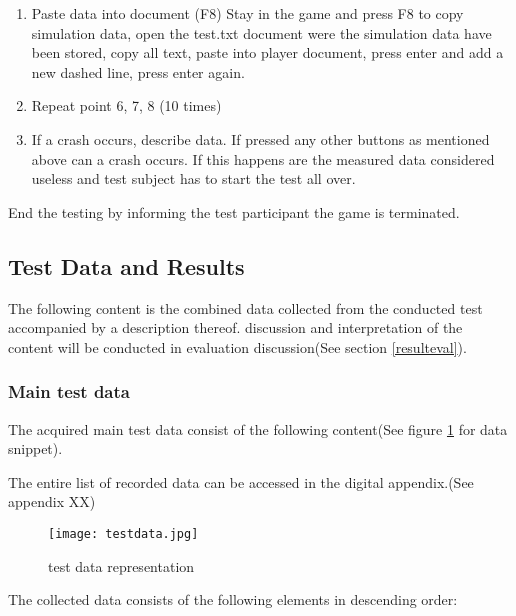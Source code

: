\begin{enumerate}
\item Paste data into document (F8)
Stay in the game and press F8 to copy simulation data, open the test.txt document were the simulation data have been stored, copy all text, paste into player document, press enter and add a new dashed line, press enter again. 

\item Repeat point 6, 7, 8 (10 times)

\item If a crash occurs, describe data.
If pressed any other buttons as mentioned above can a crash occurs. If this happens are the measured data considered useless and test subject has to start the test all over.
 \end{enumerate}

End the testing by informing the test participant the game is terminated.



\newpage
\subsection{Test Data and Results}
The following content is the combined data collected from the conducted test accompanied by a description thereof. discussion and interpretation of the content will be conducted in evaluation discussion(See section \ref{resulteval}).

\subsubsection{Main test data}
The acquired main test data consist of the following content(See figure \ref{fig:testdata} for data snippet).

The entire list of recorded data can be accessed in the digital appendix.(See appendix XX)

\begin{figure}[!htbp]
\centering
\texttt{[image: testdata.jpg]}
\caption{test data representation}
\label{fig:testdata}
\end{figure}


\newpage

The collected data consists of the following elements in descending order:

